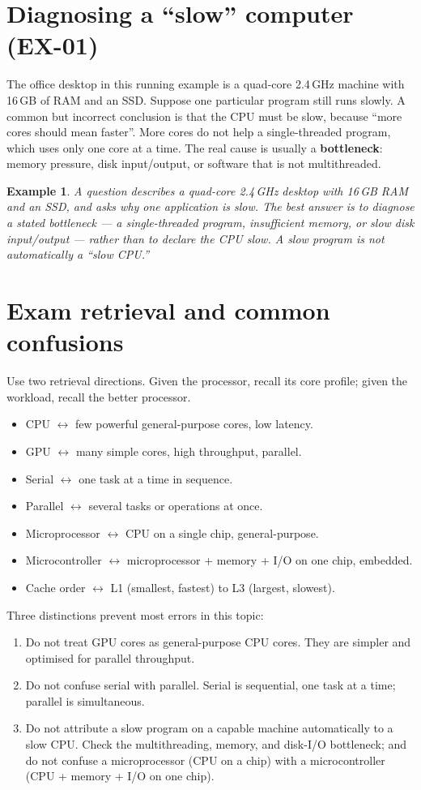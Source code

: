 \documentclass[11pt]{article}
\newtheorem{example}{Example}[section]
\begin{document}
\section{Diagnosing a ``slow'' computer (EX-01)}
The office desktop in this running example is a quad-core 2.4\,GHz machine
with 16\,GB of RAM and an SSD. Suppose one particular program still runs
slowly. A common but incorrect conclusion is that the CPU must be slow,
because ``more cores should mean faster''. More cores do not help a
single-threaded program, which uses only one core at a time. The real cause is
usually a \textbf{bottleneck}: memory pressure, disk input/output, or software
that is not multithreaded.

\begin{example}
A question describes a quad-core 2.4\,GHz desktop with 16\,GB RAM and an SSD,
and asks why one application is slow. The best answer is to diagnose a stated
bottleneck --- a single-threaded program, insufficient memory, or slow disk
input/output --- rather than to declare the CPU slow. A slow program is not
automatically a ``slow CPU.''
\end{example}

\section{Exam retrieval and common confusions}
Use two retrieval directions. Given the processor, recall its core profile;
given the workload, recall the better processor.
\begin{itemize}
  \item CPU $\leftrightarrow$ few powerful general-purpose cores, low latency.
  \item GPU $\leftrightarrow$ many simple cores, high throughput, parallel.
  \item Serial $\leftrightarrow$ one task at a time in sequence.
  \item Parallel $\leftrightarrow$ several tasks or operations at once.
  \item Microprocessor $\leftrightarrow$ CPU on a single chip, general-purpose.
  \item Microcontroller $\leftrightarrow$ microprocessor + memory + I/O on one
    chip, embedded.
  \item Cache order $\leftrightarrow$ L1 (smallest, fastest) to L3 (largest,
    slowest).
\end{itemize}

Three distinctions prevent most errors in this topic:
\begin{enumerate}
  \item Do not treat GPU cores as general-purpose CPU cores. They are simpler
    and optimised for parallel throughput.
  \item Do not confuse serial with parallel. Serial is sequential, one task at
    a time; parallel is simultaneous.
  \item Do not attribute a slow program on a capable machine automatically to
    a slow CPU. Check the multithreading, memory, and disk-I/O bottleneck; and
    do not confuse a microprocessor (CPU on a chip) with a microcontroller
    (CPU + memory + I/O on one chip).
\end{enumerate}
\end{document}
